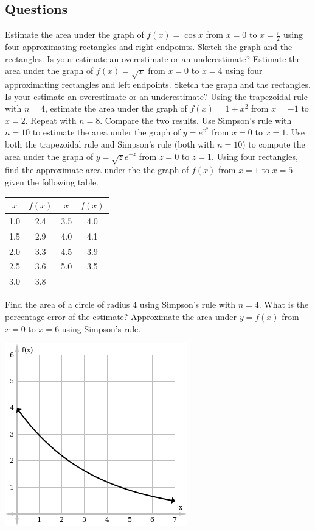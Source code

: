 \subsection*{Questions}
\begin{questions}
  \questioA Estimate the area under the graph of $ f(x) = \cos x $ from $ x = 0 $ to $ x = \frac{\pi}{2} $ using four approximating
            rectangles and right endpoints. Sketch the graph and the rectangles. Is your estimate an overestimate or an underestimate?
  \questioA Estimate the area under the graph of $ f(x) = \sqrt x $ from $ x = 0 $ to $ x = 4 $ using four approximating
            rectangles and left endpoints. Sketch the graph and the rectangles. Is your estimate an overestimate or an underestimate?
  \questioA Using the trapezoidal rule with $ n = 4 $, estimate the area under the graph of $ f(x) = 1 + x^2 $ from $ x = -1 $ to $ x = 2 $.
            Repeat with $ n = 8 $. Compare the two results.
  \questioA Use Simpson's rule with $ n = 10 $ to estimate the area under the graph of $ y = e^{x^2} $ from $ x = 0 $ to $ x = 1 $.
  \questioA Use both the trapezoidal rule and Simpson's rule (both with $ n = 10 $) to compute the area under the graph of $ y = \sqrt{z} e^{-z} $
            from $ z = 0 $ to $ z = 1 $.
  \questioA Using four rectangles, find the approximate area under the the graph of $ f(x) $ from $ x = 1 $ to $ x = 5 $ given the following table.
            \begin{center}
              \begin{tabular}{|c|c||c|c|}\hline
                $ x $ & $ f(x) $ & $ x $ & $ f(x) $\\\hline
                1.0 & 2.4 & 3.5 & 4.0\\
                1.5 & 2.9 & 4.0 & 4.1\\
                2.0 & 3.3 & 4.5 & 3.9\\
                2.5 & 3.6 & 5.0 & 3.5\\
                3.0 & 3.8 &&\\\hline
              \end{tabular}
            \end{center}
  \questioM Find the area of a circle of radius 4 using Simpson's rule with $ n = 4 $. What is the percentage error of the estimate?
  \questioA Approximate the area under $ y = f(x) $ from $ x = 0 $ to $ x = 6 $ using Simpson's rule.
            \begin{center}
              \includegraphics[width=0.35\linewidth]{aa1}

\end{center}
\end{questions}
